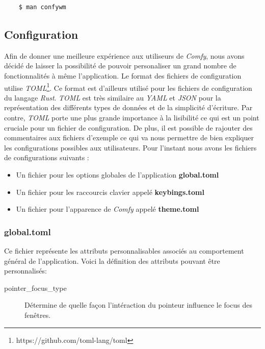 \documentclass[titlepage]{article}
\begin{document}
\begin{verbatim}
	$ man confywm
\end{verbatim}

\subsection{Configuration}
\par
\bigskip
Afin de donner une meilleure expérience aux utiliseurs de \textit{Comfy}, nous
avons décidé de laisser la possibilité de pouvoir personaliser un grand nombre
de fonctionnalités à même l'application. Le format des fichiers de configuration
utilise \textit{TOML}\footnote{https://github.com/toml-lang/toml}. Ce format
est d'ailleurs utilisé pour les fichiers de configuration du langage
\textit{Rust}. \textit{TOML} est très similaire au \textit{YAML} et
\textit{JSON} pour la représentation des différents types de données et de la
simplicité d'écriture. Par contre, \textit{TOML} porte une plus grande
importance à la lisibilité ce qui est un point cruciale pour un fichier de
configuration. De plus, il est possible de rajouter des commentaires aux
fichiers d'exemple ce qui va nous permettre de bien expliquer les configurations
possibles aux utilisateurs. Pour l'instant nous avons les fichiers de
configurations suivants :
\begin{itemize}
	\item Un fichier pour les options globales de l'application \textbf{global.toml}
	\item Un fichier pour les raccourcis clavier appelé \textbf{keybings.toml}
	\item Un fichier pour l'apparence de \textit{Comfy} appelé \textbf{theme.toml}
\end{itemize}

\subsubsection{global.toml}
\begin{minipage}{\linewidth}
	
\end{minipage}
\bigskip

\par
Ce fichier représente les attributs personnalisables associés au comportement
général de l'application. Voici la définition des attributs pouvant être
personnalisés:
\begin{description}
	\item [pointer\_focus\_type]
		Détermine de quelle façon l'intéraction du pointeur influence le focus des
		fenêtres.
\end{description}
\end{document}
